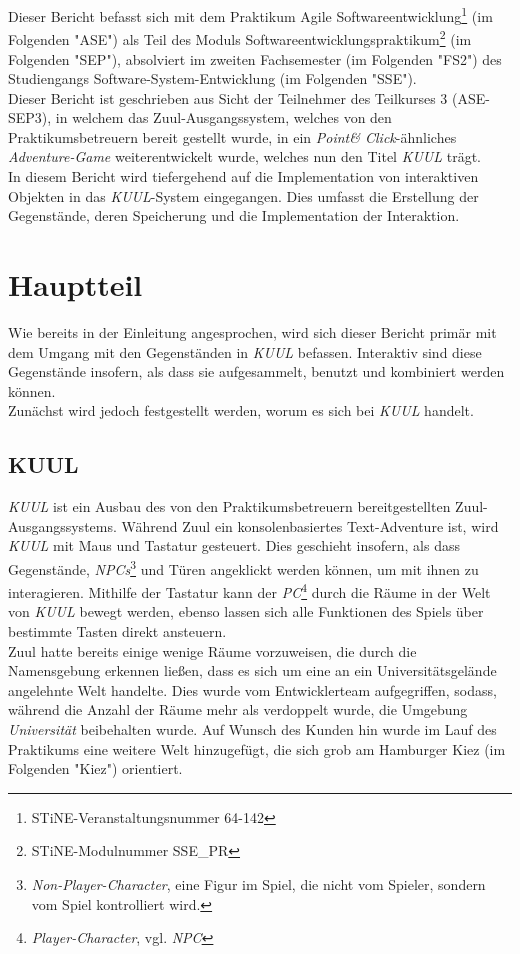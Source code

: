\documentclass[12pt,twoside]{article}
\theoremstyle{plain}
\theoremstyle{definition}
\theoremstyle{remark}
\begin{document}
Dieser Bericht befasst sich mit dem Praktikum Agile Softwareentwicklung\footnote{STiNE-Veranstaltungsnummer 64-142} (im Folgenden \string"ASE") als Teil des Moduls Softwareentwicklungspraktikum\footnote{STiNE-Modulnummer SSE\_PR} (im Folgenden \string"SEP"), absolviert im zweiten Fachsemester (im Folgenden "FS2") des Studiengangs Software-System-Entwicklung (im Folgenden \string"SSE").\\
Dieser Bericht ist geschrieben aus Sicht der Teilnehmer des Teilkurses 3 (ASE-SEP3), in welchem das Zuul-Ausgangssystem, welches von den Praktikumsbetreuern bereit gestellt wurde, in ein \textit{Point\& Click}-ähnliches \textit{Adventure-Game} weiterentwickelt wurde, welches nun den Titel \textit{KUUL} trägt.\\
In diesem Bericht wird tiefergehend auf die Implementation von interaktiven Objekten in das \textit{KUUL}-System eingegangen.
Dies umfasst die Erstellung der Gegenstände, deren Speicherung und die Implementation der Interaktion.
\section{Hauptteil}
\label{sec:main}
Wie bereits in der Einleitung angesprochen, wird sich dieser Bericht primär mit dem Umgang mit den Gegenständen in \textit{KUUL} befassen.
Interaktiv sind diese Gegenstände insofern, als dass sie aufgesammelt, benutzt und kombiniert werden können.\\
Zunächst wird jedoch festgestellt werden, worum es sich bei \textit{KUUL} handelt.
\subsection{KUUL}
\label{ssec:main_kuul}
\textit{KUUL} ist ein Ausbau des von den Praktikumsbetreuern bereitgestellten Zuul-Ausgangssystems.
Während Zuul ein konsolenbasiertes Text-Adventure ist, wird \textit{KUUL} mit Maus und Tastatur gesteuert.
Dies geschieht insofern, als dass Gegenstände, \textit{NPCs}\footnote{\textit{Non-Player-Character}, eine Figur im Spiel, die nicht vom Spieler, sondern vom Spiel kontrolliert wird.} und Türen angeklickt werden können, um mit ihnen zu interagieren.
Mithilfe der Tastatur kann der \textit{PC}\footnote{\textit{Player-Character}, vgl. \textit{NPC}} durch die Räume in der Welt von \textit{KUUL} bewegt werden, ebenso lassen sich alle Funktionen des Spiels über bestimmte Tasten direkt ansteuern.\\
Zuul hatte bereits einige wenige Räume vorzuweisen, die durch die Namensgebung erkennen ließen, dass es sich um eine an ein Universitätsgelände angelehnte Welt handelte.
Dies wurde vom Entwicklerteam aufgegriffen, sodass, während die Anzahl der Räume mehr als verdoppelt wurde, die Umgebung \textit{Universität} beibehalten wurde.
Auf Wunsch des Kunden hin wurde im Lauf des Praktikums eine weitere Welt hinzugefügt, die sich grob am Hamburger Kiez (im Folgenden "Kiez") orientiert.
\end{document}
